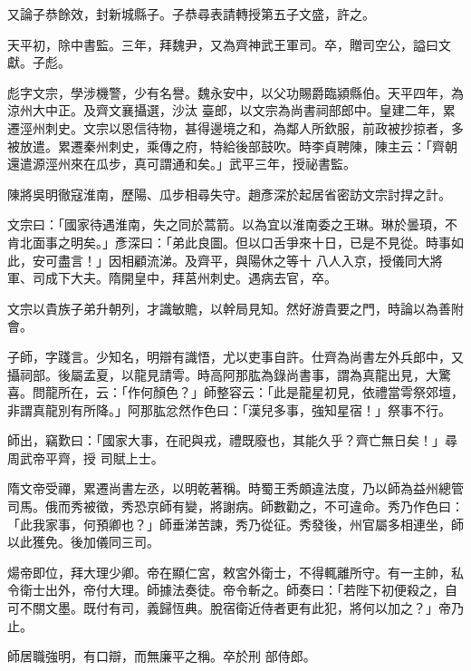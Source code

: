 \begin{pinyinscope}
 又論子恭餘效，封新城縣子。子恭尋表請轉授第五子文盛，許之。



 天平初，除中書監。三年，拜魏尹，又為齊神武王軍司。卒，贈司空公，謚曰文獻。子彪。



 彪字文宗，學涉機警，少有名譽。魏永安中，以父功賜爵臨潁縣伯。天平四年，為涼州大中正。及齊文襄攝選，沙汰
 臺郎，以文宗為尚書祠部郎中。皇建二年，累遷涇州刺史。文宗以恩信待物，甚得邊境之和，為鄰人所欽服，前政被抄掠者，多被放遣。累遷秦州刺史，乘傳之府，特給後部鼓吹。時李貞聘陳，陳主云：「齊朝還遣源涇州來在瓜步，真可謂通和矣。」武平三年，授祕書監。



 陳將吳明徹寇淮南，歷陽、瓜步相尋失守。趙彥深於起居省密訪文宗討捍之計。



 文宗曰：「國家待遇淮南，失之同於蒿箭。以為宜以淮南委之王琳。琳於曇頊，不肯北面事之明矣。」彥深曰：「弟此良圖。但以口舌爭來十日，已是不見從。時事如此，安可盡言！」因相顧流涕。及齊平，與陽休之等十
 八人入京，授儀同大將軍、司成下大夫。隋開皇中，拜莒州刺史。遇病去官，卒。



 文宗以貴族子弟升朝列，才識敏贍，以幹局見知。然好游貴要之門，時論以為善附會。



 子師，字踐言。少知名，明辯有識悟，尤以吏事自許。仕齊為尚書左外兵郎中，又攝祠部。後屬孟夏，以龍見請雩。時高阿那肱為錄尚書事，謂為真龍出見，大驚喜。問龍所在，云：「作何顏色？」師整容云：「此是龍星初見，依禮當雩祭郊壇，非謂真龍別有所降。」阿那肱忿然作色曰：「漢兒多事，強知星宿！」祭事不行。



 師出，竊歎曰：「國家大事，在祀與戎，禮既廢也，其能久乎？齊亡無日矣！」尋周武帝平齊，授
 司賦上士。



 隋文帝受禪，累遷尚書左丞，以明乾著稱。時蜀王秀頗違法度，乃以師為益州總管司馬。俄而秀被徵，秀恐京師有變，將謝病。師數勸之，不可違命。秀乃作色曰：「此我家事，何預卿也？」師垂涕苦諫，秀乃從征。秀發後，州官屬多相連坐，師以此獲免。後加儀同三司。



 煬帝即位，拜大理少卿。帝在顯仁宮，敕宮外衛士，不得輒離所守。有一主帥，私令衛士出外，帝付大理。師據法奏徒。帝令斬之。師奏曰：「若陛下初便殺之，自可不關文墨。既付有司，義歸恆典。脫宿衛近侍者更有此犯，將何以加之？」帝乃止。



 師居職強明，有口辯，而無廉平之稱。卒於刑
 部侍郎。




\end{pinyinscope}

